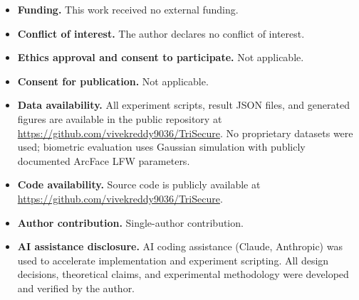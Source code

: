 \documentclass[pdflatex,sn-mathphys-num]{sn-jnl}%
\theoremstyle{thmstyleone}%
\theoremstyle{thmstyletwo}%
\theoremstyle{thmstylethree}%
\begin{document}
\begin{itemize}
\item \textbf{Funding.} This work received no external funding.
\item \textbf{Conflict of interest.} The author declares no conflict of interest.
\item \textbf{Ethics approval and consent to participate.} Not applicable.
\item \textbf{Consent for publication.} Not applicable.
\item \textbf{Data availability.} All experiment scripts, result JSON files, and
  generated figures are available in the public repository at
  \url{https://github.com/vivekreddy9036/TriSecure}. No proprietary datasets
  were used; biometric evaluation uses Gaussian simulation with publicly
  documented ArcFace LFW parameters.
\item \textbf{Code availability.} Source code is publicly available at
  \url{https://github.com/vivekreddy9036/TriSecure}.
\item \textbf{Author contribution.} Single-author contribution.
\item \textbf{AI assistance disclosure.} AI coding assistance (Claude,
  Anthropic) was used to accelerate implementation and experiment scripting. All
  design decisions, theoretical claims, and experimental methodology were
  developed and verified by the author.
\end{itemize}


\end{document}
